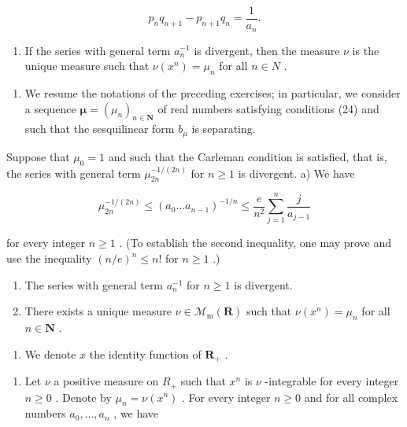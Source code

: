 \[
p _ {n} q _ {n + 1} - p _ {n + 1} q _ {n} = \frac {1}{a _ {n}}.
\]

\begin{enumerate}
\def\labelenumi{\alph{enumi})}
\setcounter{enumi}{5}
\tightlist
\item
  If the series with general term \(a_{n}^{-1}\) is divergent, then the measure \(\nu\) is the unique measure such that \(\nu(x^{n}) = \mu_{n}\) for all \(n \in N\) .
\end{enumerate}

\begin{enumerate}
\def\labelenumi{\arabic{enumi})}
\setcounter{enumi}{24}
\tightlist
\item
  We resume the notations of the preceding exercises; in particular, we consider a sequence \(\boldsymbol{\mu} = (\mu_{n})_{n \in \mathbf{N}}\) of real numbers satisfying conditions (24) and such that the sesquilinear form \(b_{\mu}\) is separating.
\end{enumerate}

Suppose that \(\mu_{0}=1\) and such that the Carleman condition is satisfied, that is, the series with general term \(\mu_{2n}^{-1/(2n)}\) for \(n\geqslant1\) is divergent. a) We have

\[
\mu_ {2 n} ^ {- 1 / (2 n)} \leqslant (a _ {0} \dots a _ {n - 1}) ^ {- 1 / n} \leqslant \frac {e}{n ^ {2}} \sum_ {j = 1} ^ {n} \frac {j}{a _ {j - 1}}
\]

for every integer \(n \geqslant 1\) . (To establish the second inequality, one may prove and use the inequality \((n/e)^{n} \leqslant n!\) for \(n \geqslant 1\) .)

\begin{enumerate}
\def\labelenumi{\alph{enumi})}
\setcounter{enumi}{1}
\item
  The series with general term \(a_{n}^{-1}\) for \(n \geqslant 1\) is divergent.
\item
  There exists a unique measure \(\nu \in \mathcal{M}_{\mathrm{m}}(\mathbf{R})\) such that \(\nu(x^n) = \mu_n\) for all \(n \in \mathbf{N}\) .
\end{enumerate}

\begin{enumerate}
\def\labelenumi{\arabic{enumi})}
\setcounter{enumi}{25}
\tightlist
\item
  We denote \(x\) the identity function of \(\mathbf{R}_{+}\) .
\end{enumerate}

\begin{enumerate}
\def\labelenumi{\alph{enumi})}
\tightlist
\item
  Let \(\nu\) a positive measure on \(R_{+}\) such that \(x^{n}\) is \(\nu\) -integrable for every integer \(n \geqslant 0\) . Denote by \(\mu_{n} = \nu(x^{n})\) . For every integer \(n \geqslant 0\) and for all complex numbers \(a_{0}, \ldots, a_{n}\) , we have
\end{enumerate}

